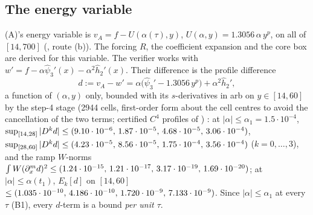 \documentclass[11pt]{article}
\begin{document}
\subsection{The energy variable}\label{A:sec:var}
(A)'s energy variable is $v_A=f-U(\alpha(\tau),y)$, $U(\alpha,y)=1.3056\,\alpha\,y^p$, on all of $[14,700]$ (, route (b)). The forcing $R$, the coefficient expansion and the core box are derived for this variable. The verifier works with $w'=f-\alpha\hat\psi_3'(x)-\alpha^2\hat h_2'(x)$. Their difference is the profile difference
\[
d:=v_A-w'=\alpha\bigl(\hat\psi_3'-1.3056\,y^p\bigr)+\alpha^2\hat h_2' ,
\]
a function of $(\alpha,y)$ only, bounded with its $s$-derivatives in arb on $y\in[14,60]$ by the step-4 stage  (2944 cells, first-order form about the cell centres to avoid the cancellation of the two terms; certified $C^4$ profiles of ) \tC: at $|\alpha|\le\alpha_1=1.5\cdot10^{-4}$, $\sup_{[14,28]}|D^kd|\le(9.10\cdot10^{-6},\,1.87\cdot10^{-5},\,4.68\cdot10^{-5},\,3.06\cdot10^{-4})$, $\sup_{[28,60]}|D^kd|\le(4.23\cdot10^{-5},\,8.56\cdot10^{-5},\,1.75\cdot10^{-4},\,3.56\cdot10^{-4})$ ($k=0,\dots,3$), and the ramp $W$-norms $\int W(\partial_x^md)^2\le(1.24\cdot10^{-15},\,1.21\cdot10^{-17},\,3.17\cdot10^{-19},\,1.69\cdot10^{-20})$; at $|\alpha|\le\alpha(t_1)$, $E_k[d]$ on $[14,60]$ $\le(1.035\cdot10^{-10},\,4.186\cdot10^{-10},\,1.720\cdot10^{-9},\,7.133\cdot10^{-9})$. Since $|\alpha|\le\alpha_1$ at every $\tau$ (B1), every $d$-term is a bound \emph{per unit $\tau$}.
\end{document}
